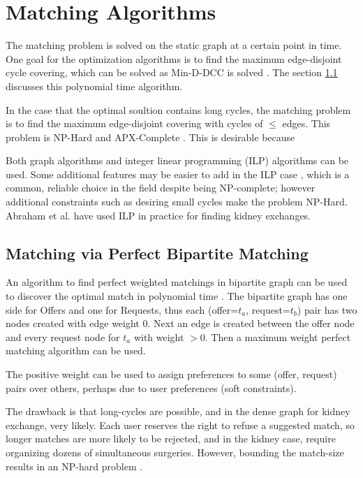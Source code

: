 \documentclass[main.tex]{subfiles}
\begin{document}
\section{Matching Algorithms}
The matching problem is solved on the static graph at a certain point in time. One goal for the optimization algorithms is to find the maximum edge-disjoint cycle covering, which can be solved as Min-D-DCC is solved \cite{Man1} \cite{Bir}. The section \ref{bima} discusses this polynomial time algorithm.

In the case that the optimal soultion contains long cycles, the matching problem is to find the maximum edge-disjoint covering with cycles of $\leq$ edges. This problem is NP-Hard and APX-Complete \cite{Bir}. This is desirable because

Both graph algorithms and integer linear programming (ILP) algorithms can be used. Some additional features may be easier to add in the ILP case , which is a common, reliable choice in the field despite being NP-complete; however additional constraints such as desiring small cycles make the problem NP-Hard. Abraham et al. \cite{Abr1} have used ILP in practice for finding kidney exchanges.

\subsection{Matching via Perfect Bipartite Matching}\label{bima}

An algorithm to find perfect weighted matchings in bipartite graph can be used to discover the optimal match in polynomial time \cite{Bir}. The bipartite graph has one side for Offers and one for Requests, thus each (offer=$t_a$, request=$t_b$) pair has two nodes created with edge weight $0$. Next an edge is created between the offer node and every request node for $t_a$ with weight $> 0$. Then a maximum weight perfect matching algorithm can be used.

The positive weight can be used to assign preferences to some (offer, request) pairs over others, perhaps due to user preferences (soft constraints).

The drawback is that long-cycles are possible, and in the dense graph for kidney exchange, very likely. Each user reserves the right to refuse a suggested match, so longer matches are more likely to be rejected, and in the kidney case, require organizing dozens of simultaneous surgeries. However, bounding the match-size results in an NP-hard problem \cite{Bir}.
\end{document}
